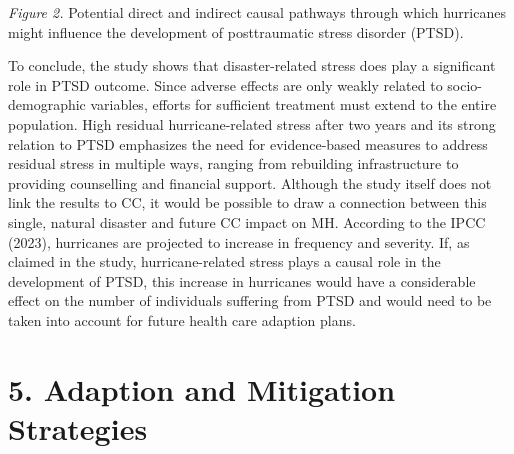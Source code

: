 \documentclass[
]{krantz}
\begin{document}
\emph{Figure 2.} Potential direct and indirect causal pathways through which hurricanes might influence the development of posttraumatic stress disorder (PTSD).

To conclude, the study shows that disaster-related stress does play a significant role in PTSD outcome. Since adverse effects are only weakly related to socio-demographic variables, efforts for sufficient treatment must extend to the entire population. High residual hurricane-related stress after two years and its strong relation to PTSD emphasizes the need for evidence-based measures to address residual stress in multiple ways, ranging from rebuilding infrastructure to providing counselling and financial support.
Although the study itself does not link the results to CC, it would be possible to draw a connection between this single, natural disaster and future CC impact on MH. According to the IPCC (2023), hurricanes are projected to increase in frequency and severity. If, as claimed in the study, hurricane-related stress plays a causal role in the development of PTSD, this increase in hurricanes would have a considerable effect on the number of individuals suffering from PTSD and would need to be taken into account for future health care adaption plans.

\section{5. Adaption and Mitigation Strategies}\label{adaption-and-mitigation-strategies}
\end{document}

